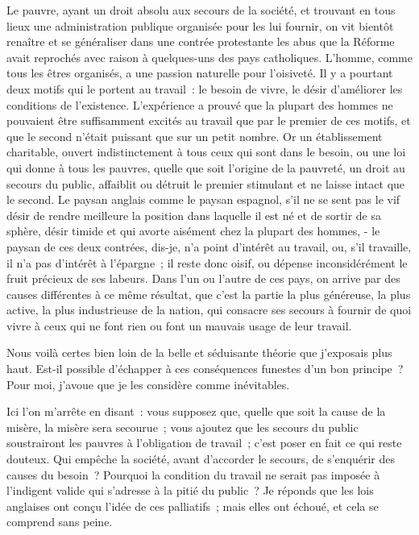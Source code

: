 \documentclass[twoside]{book} %
\begin{document}
Le pauvre, ayant un droit absolu aux secours de la société, et trouvant en tous lieux une administration publique organisée pour les lui fournir, on vit bientôt renaître et se généraliser dans une contrée protestante les abus que la Réforme avait reprochés avec raison à quelques-uns des pays catholiques. L'homme, comme tous les êtres organisés, a une passion naturelle pour l’oisiveté. Il y a pourtant deux motifs qui le portent au travail : le besoin de vivre, le désir d’améliorer les conditions de l’existence. L’expérience a prouvé que la plupart des hommes ne pouvaient être suffisamment excités au travail que par le premier de ces motifs, et que le second n’était puissant que sur un petit nombre. Or un établissement charitable, ouvert indistinctement à tous ceux qui sont dans le besoin, ou une loi qui donne à tous les pauvres, quelle que soit l’origine de la pauvreté, un droit au secours du public, affaiblit ou détruit le premier stimulant et ne laisse intact que le second. Le paysan anglais comme le paysan espagnol, s’il ne se sent pas le vif désir de rendre meilleure la position dans laquelle il est né et de sortir de sa sphère, désir timide et qui avorte aisément chez la plupart des hommes, - le paysan de ces deux contrées, dis-je, n’a point d’intérêt au travail, ou, s’il travaille, il n’a pas d’intérêt à l’épargne ; il reste donc oisif, ou dépense inconsidérément le fruit précieux de ses labeurs. Dans l’un ou l’autre de ces pays, on arrive par des causes différentes à ce même résultat, que c’est la partie la plus généreuse, la plus active, la plus industrieuse de la nation, qui consacre ses secours à fournir de quoi vivre à ceux qui ne font rien ou font un mauvais usage de leur travail.\par
\bigbreak
\noindent Nous voilà certes bien loin de la belle et séduisante théorie que j’exposais plus haut. Est-il possible d’échapper à ces conséquences funestes d’un bon principe ? Pour moi, j’avoue que je les considère comme inévitables.\par
\bigbreak
\noindent Ici l’on m’arrête en disant : vous supposez que, quelle que soit la cause de la misère, la misère sera secourue ; vous ajoutez que les secours du public soustrairont les pauvres à l’obligation de travail ; c’est poser en fait ce qui reste douteux. Qui empêche la société, avant d’accorder le secours, de s’enquérir des causes du besoin ? Pourquoi la condition du travail ne serait pas imposée à l’indigent valide qui s’adresse à la pitié du public ? Je réponds que les lois anglaises ont conçu l’idée de ces palliatifs ; mais elles ont échoué, et cela se comprend sans peine.\par
\end{document}

